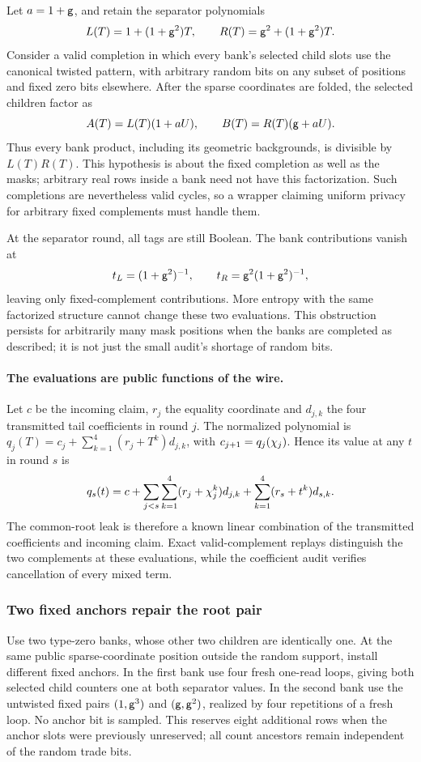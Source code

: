 Let $a=1+\mathsf{g}$, and retain the separator polynomials
\[
 L(T)=1+(1+\mathsf{g}^2)T,
 \qquad R(T)=\mathsf{g}^2+(1+\mathsf{g}^2)T.
\]
Consider a valid completion in which every bank's selected child slots use the canonical twisted pattern, with arbitrary random bits on any subset of positions and fixed zero bits elsewhere. After the sparse coordinates are folded, the selected children factor as
\[
 A(T)=L(T)(1+aU),\qquad B(T)=R(T)(\mathsf{g}+aU).
\]
Thus every bank product, including its geometric backgrounds, is divisible by $L(T)R(T)$. This hypothesis is about the fixed completion as well as the masks; arbitrary real rows inside a bank need not have this factorization. Such completions are nevertheless valid cycles, so a wrapper claiming uniform privacy for arbitrary fixed complements must handle them.

At the separator round, all tags are still Boolean. The bank contributions vanish at
\[
 t_L=(1+\mathsf{g}^2)^{-1},\qquad t_R=\mathsf{g}^2(1+\mathsf{g}^2)^{-1},
\]
leaving only fixed-complement contributions. More entropy with the same factorized structure cannot change these two evaluations. This obstruction persists for arbitrarily many mask positions when the banks are completed as described; it is not just the small audit's shortage of random bits.

\paragraph{The evaluations are public functions of the wire.} Let $c$ be the incoming claim, $r_j$ the equality coordinate and $d_{j,k}$ the four transmitted tail coefficients in round $j$. The normalized polynomial is $q_j(T)=c_j+\sum_{k=1}^4(r_j+T^k)d_{j,k}$, with $c_{j+1}=q_j(\chi_j)$. Hence its value at any $t$ in round $s$ is
\[
 q_s(t)=c+
 \sum_{j<s}\sum_{k=1}^4(r_j+\chi_j^k)d_{j,k}
 +\sum_{k=1}^4(r_s+t^k)d_{s,k}.
\]
The common-root leak is therefore a known linear combination of the transmitted coefficients and incoming claim. Exact valid-complement replays distinguish the two complements at these evaluations, while the coefficient audit verifies cancellation of every mixed term.

\subsubsection{Two fixed anchors repair the root pair}

Use two type-zero banks, whose other two children are identically one. At the same public sparse-coordinate position outside the random support, install different fixed anchors. In the first bank use four fresh one-read loops, giving both selected child counters one at both separator values. In the second bank use the untwisted fixed pairs $(1,\mathsf{g}^3)$ and $(\mathsf{g},\mathsf{g}^2)$, realized by four repetitions of a fresh loop. No anchor bit is sampled. This reserves eight additional rows when the anchor slots were previously unreserved; all count ancestors remain independent of the random trade bits.

